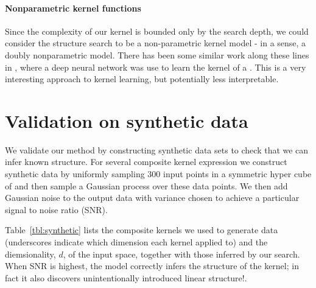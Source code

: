 \documentclass[twoside]{article}
\begin{document}
\paragraph{Nonparametric kernel functions}

Since the complexity of our kernel is bounded only by the search depth, we could consider the structure search to be a non-parametric kernel model - in a sense, a doubly nonparametric model.
There has been some similar work along these lines in \cite{salakhutdinov2008using}, where a deep neural network was use to learn the kernel of a \gp{}.
This is a very interesting approach to kernel learning, but potentially less interpretable.


\section{Validation on synthetic data}

We validate our method by constructing synthetic data sets to check that we can infer known structure.
For several composite kernel expression we construct synthetic data by uniformly sampling 300 input points in a symmetric hyper cube of and then sample a Gaussian process over these data points.
We then add \iid Gaussian noise to the output data with variance chosen to achieve a particular signal to noise ratio (SNR\footnotemark).

Table~\ref{tbl:synthetic} lists the composite kernels we used to generate data (underscores indicate which dimension each kernel applied to) and the diemsionality, $d$, of the input space, together with those inferred by our search.
When SNR is highest, the model correctly infers the structure of the kernel; in fact it also discovers unintentionally introduced linear structure\footnotemark!.

\end{document}
